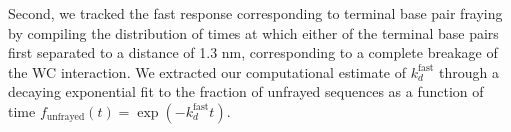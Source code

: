 \documentclass[journal=jpcbfk,manuscript=article]{achemso}
\newcommand*{\rood}[1]{{#1}}
\begin{document}

    
	

Second, we tracked the fast response corresponding to terminal base pair fraying by compiling the distribution of times at which either of the terminal base pairs first separated to a distance of 1.3 nm, corresponding to a complete breakage of the WC interaction. We extracted our computational estimate of $k_d^\mathrm{fast}$ through a decaying exponential fit to the fraction of unfrayed sequences as a function of time $f_{\mathrm{unfrayed}}(t) = \exp(-k_d^\mathrm{fast}t)$. 
\end{document}
